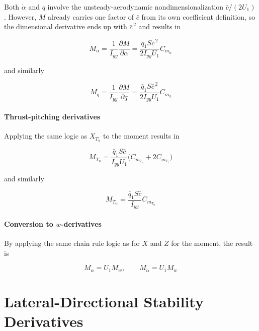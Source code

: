 \documentclass[11pt]{article}
\newcommand{\qbar}{\bar{q}}
\newcommand{\cbar}{\bar{c}}
\newcommand{\Iyy}{I_{yy}}
\newcommand{\dd}[2]{\dfrac{\partial #1}{\partial #2}}
\begin{document}
Both $\dot\alpha$ and $q$ involve the unsteady-aerodynamic nondimensionalization $\cbar/(2U_1)$.
However, $M$ already carries one factor of $\cbar$ from its own coefficient
definition, so the dimensional derivative ends up with $\cbar^{\,2}$ and results in

\begin{equation}\label{eq:equation_26}
\boxed{\;M_{\dot\alpha} = \frac{1}{\Iyy}\dd{M}{\dot\alpha}
       = \frac{\qbar_1 S\cbar^{\,2}}{2\Iyy U_1}C_{m_{\dot\alpha}}\;}
\end{equation}

and similarly

\begin{equation}\label{eq:equation_27}
\boxed{\;M_q = \frac{1}{\Iyy}\dd{M}{q}
       = \frac{\qbar_1 S\cbar^{\,2}}{2\Iyy U_1}C_{m_q}\;}
\end{equation}

\subsection{Thrust-pitching derivatives}

Applying the same logic as $X_{T_u}$ to the moment results in

\begin{equation}\label{eq:equation_28}
\boxed{\;M_{T_u} = \frac{\qbar_1 S\cbar}{\Iyy U_1}\bigl(C_{m_{T_u}} + 2C_{m_{T_1}}\bigr)\;}
\end{equation}

and similarly

\begin{equation}\label{eq:equation_29}
\boxed{\;M_{T_\alpha} = \frac{\qbar_1 S\cbar}{\Iyy}C_{m_{T_\alpha}}\;}
\end{equation}

\subsection{Conversion to $w$-derivatives}

By applying the same chain rule logic as for $X$ and $Z$ for the moment, the result is

\begin{equation}\label{eq:equation_30}
\boxed{\;M_\alpha = U_1 M_w, \qquad M_{\dot\alpha} = U_1 M_{\dot w}\;}
\end{equation}

\part*{Lateral-Directional Stability Derivatives}
\end{document}
